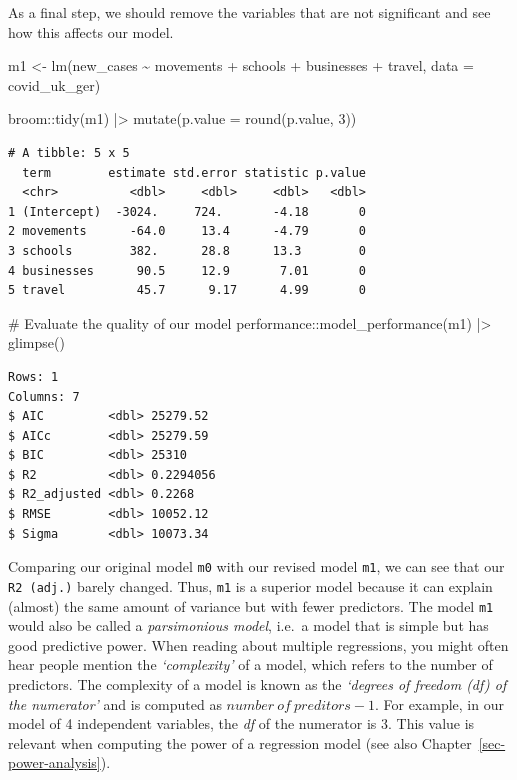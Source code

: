 \documentclass[
  letterpaper,
  DIV=11,
  numbers=noendperiod]{scrreprt}
\newenvironment{Shaded}{\begin{snugshade}}{\end{snugshade}}
\newcommand{\AttributeTok}[1]{\textcolor[rgb]{0.40,0.45,0.13}{#1}}
\newcommand{\CommentTok}[1]{\textcolor[rgb]{0.37,0.37,0.37}{#1}}
\newcommand{\DecValTok}[1]{\textcolor[rgb]{0.68,0.00,0.00}{#1}}
\newcommand{\FunctionTok}[1]{\textcolor[rgb]{0.28,0.35,0.67}{#1}}
\newcommand{\NormalTok}[1]{\textcolor[rgb]{0.00,0.23,0.31}{#1}}
\newcommand{\OtherTok}[1]{\textcolor[rgb]{0.00,0.23,0.31}{#1}}
\newcommand{\SpecialCharTok}[1]{\textcolor[rgb]{0.37,0.37,0.37}{#1}}
\begin{document}
As a final step, we should remove the variables that are not significant
and see how this affects our model.

\begin{Shaded}
\begin{Highlighting}[]
\NormalTok{m1 }\OtherTok{\textless{}{-}} \FunctionTok{lm}\NormalTok{(new\_cases }\SpecialCharTok{\textasciitilde{}}\NormalTok{ movements }\SpecialCharTok{+}\NormalTok{ schools }\SpecialCharTok{+}\NormalTok{ businesses }\SpecialCharTok{+}\NormalTok{ travel,}
         \AttributeTok{data =}\NormalTok{ covid\_uk\_ger)}

\NormalTok{broom}\SpecialCharTok{::}\FunctionTok{tidy}\NormalTok{(m1) }\SpecialCharTok{|\textgreater{}}
  \FunctionTok{mutate}\NormalTok{(}\AttributeTok{p.value =} \FunctionTok{round}\NormalTok{(p.value, }\DecValTok{3}\NormalTok{))}
\end{Highlighting}
\end{Shaded}

\begin{verbatim}
# A tibble: 5 x 5
  term        estimate std.error statistic p.value
  <chr>          <dbl>     <dbl>     <dbl>   <dbl>
1 (Intercept)  -3024.     724.       -4.18       0
2 movements      -64.0     13.4      -4.79       0
3 schools        382.      28.8      13.3        0
4 businesses      90.5     12.9       7.01       0
5 travel          45.7      9.17      4.99       0
\end{verbatim}

\begin{Shaded}
\begin{Highlighting}[]
\CommentTok{\# Evaluate the quality of our model}
\NormalTok{performance}\SpecialCharTok{::}\FunctionTok{model\_performance}\NormalTok{(m1) }\SpecialCharTok{|\textgreater{}}
  \FunctionTok{glimpse}\NormalTok{()}
\end{Highlighting}
\end{Shaded}

\begin{verbatim}
Rows: 1
Columns: 7
$ AIC         <dbl> 25279.52
$ AICc        <dbl> 25279.59
$ BIC         <dbl> 25310
$ R2          <dbl> 0.2294056
$ R2_adjusted <dbl> 0.2268
$ RMSE        <dbl> 10052.12
$ Sigma       <dbl> 10073.34
\end{verbatim}

Comparing our original model \texttt{m0} with our revised model
\texttt{m1}, we can see that our \texttt{R2\ (adj.)} barely changed.
Thus, \texttt{m1} is a superior model because it can explain (almost)
the same amount of variance but with fewer predictors. The model
\texttt{m1} would also be called a \emph{parsimonious model}, i.e.~a
model that is simple but has good predictive power. When reading about
multiple regressions, you might often hear people mention the
\emph{`complexity'} of a model, which refers to the number of
predictors. The complexity of a model is known as the \emph{`degrees of
freedom (df) of the numerator'} and is computed as
\(number\ of\ preditors - 1\). For example, in our model of 4
independent variables, the \emph{df} of the numerator is 3. This value
is relevant when computing the power of a regression model (see also
Chapter~\ref{sec-power-analysis}).
\end{document}
